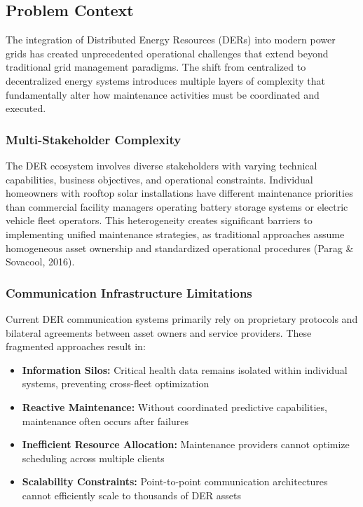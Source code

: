 \subsection{Problem Context}

The integration of Distributed Energy Resources (DERs) into modern power grids has created unprecedented operational challenges that extend beyond traditional grid management paradigms. The shift from centralized to decentralized energy systems introduces multiple layers of complexity that fundamentally alter how maintenance activities must be coordinated and executed.

\subsubsection{Multi-Stakeholder Complexity}

The DER ecosystem involves diverse stakeholders with varying technical capabilities, business objectives, and operational constraints. Individual homeowners with rooftop solar installations have different maintenance priorities than commercial facility managers operating battery storage systems or electric vehicle fleet operators. This heterogeneity creates significant barriers to implementing unified maintenance strategies, as traditional approaches assume homogeneous asset ownership and standardized operational procedures (Parag \& Sovacool, 2016).

\subsubsection{Communication Infrastructure Limitations}

Current DER communication systems primarily rely on proprietary protocols and bilateral agreements between asset owners and service providers. These fragmented approaches result in:
\begin{itemize}
\item \textbf{Information Silos:} Critical health data remains isolated within individual systems, preventing cross-fleet optimization
\item \textbf{Reactive Maintenance:} Without coordinated predictive capabilities, maintenance often occurs after failures
\item \textbf{Inefficient Resource Allocation:} Maintenance providers cannot optimize scheduling across multiple clients
\item \textbf{Scalability Constraints:} Point-to-point communication architectures cannot efficiently scale to thousands of DER assets
\end{itemize}

